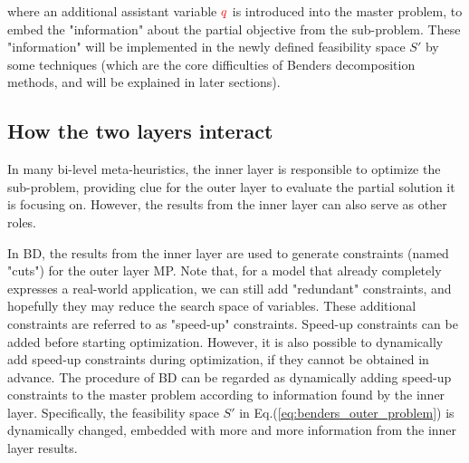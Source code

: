 \documentclass[twocolumn]{ctexart}
\begin{document}
where an additional assistant variable ${\color{red} q}$ is introduced into the master problem,
to embed the "information" about the partial objective from the sub-problem.
These "information" will be implemented in the newly defined feasibility space $S'$
by some techniques (which are the core difficulties of Benders decomposition methods, and will be explained in later sections).




\subsection{How the two layers interact}


In many bi-level meta-heuristics,
the inner layer is responsible to optimize the sub-problem,
providing clue for the outer layer to evaluate the partial solution it is focusing on.
However, the results from the inner layer can also serve as other roles.


In BD, the results from the inner layer are used to generate constraints (named "cuts") for the outer layer MP.
Note that,
for a model that already completely expresses a real-world application,
we can still add "redundant" constraints,
and hopefully they may reduce the search space of variables.
These additional constraints are referred to as "speed-up" constraints.
Speed-up constraints can be added before starting optimization.
However, it is also possible to dynamically add speed-up constraints during optimization, if they cannot be obtained in advance.
The procedure of BD can be regarded as
dynamically adding speed-up constraints to the master problem
according to information found by the inner layer.
Specifically, the feasibility space $ S'$ in Eq.(\ref{eq:benders_outer_problem}) is dynamically changed,
embedded with more and more information
from the inner layer results.
\end{document}
